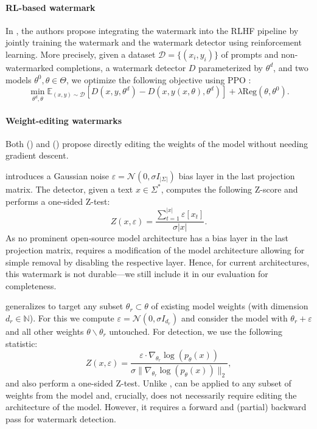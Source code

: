 \paragraph{RL-based watermark}
In \citet{rlwatermark}, the authors propose integrating the watermark into the RLHF pipeline \citep{rlhf} by jointly training the watermark and the watermark detector using reinforcement learning.  
More precisely, given a dataset $\mathcal{D} = \{(x_i,y_i)\}$ of prompts and non-watermarked completions, a watermark detector $D$ parameterized by $\theta^d$, and two models $\theta^0, \theta \in \Theta$, we optimize the following objective using PPO \citep{ppo}:  
\begin{equation}
    \min_{\theta^d, \theta} \mathbb{E}_{(x,y) \sim \mathcal{D}}[D(x,y,\theta^d) - D(x,y(x,\theta),\theta^d)] + \lambda \text{Reg}(\theta, \theta^0).
\end{equation}
 
\paragraph{Weight-editing watermarks}
Both \citet{unremovable} (\unremovable) and \citet{gaussmark} (\gaussmark) propose directly editing the weights of the model without needing gradient descent.

\unremovable introduces a Gaussian noise $\varepsilon = \mathcal{N}(0, \sigma I_{|\Sigma|})$ bias layer in the last projection matrix.
The detector, given a text $x \in \Sigma^*$, computes the following Z-score and performs a one-sided Z-test:
\begin{equation}
    \label{eq:unremovable_detector}
    Z(x, \varepsilon) = \frac{\sum_{t=1}^{|x|} \varepsilon[x_t]}{\sigma|x|}.
\end{equation}
As no prominent open-source model architecture has a bias layer in the last projection matrix, \unremovable requires a modification of the model architecture allowing for simple removal by disabling the respective layer.
Hence, for current architectures, this watermark is not durable---we still include it in our evaluation for completeness.

\gaussmark generalizes \unremovable to target any subset $\theta_r \subset \theta$ of existing model weights (with dimension $d_r \in \mathbb{N}$).
For this we compute $\varepsilon = \mathcal{N}(0, \sigma I_{d_r})$ and consider the model with $\theta_r + \varepsilon$ and all other weights $\theta \backslash \theta_r$ untouched. For detection, we use the following statistic:
\begin{equation}
    \label{eq:gaussmark-detector}
    Z(x, \varepsilon) = \frac{ \varepsilon \cdot \nabla_{\theta_r} \log(p_{\theta}(x)) }{\sigma \lVert \nabla_{\theta_r} \log(p_{\theta}(x)) \rVert _2},
\end{equation}
and also perform a one-sided Z-test. Unlike \unremovable, \gaussmark can be applied to any subset of weights from the model and, crucially, does not necessarily require editing the architecture of the model.
However, it requires a forward and (partial) backward pass for watermark detection.
